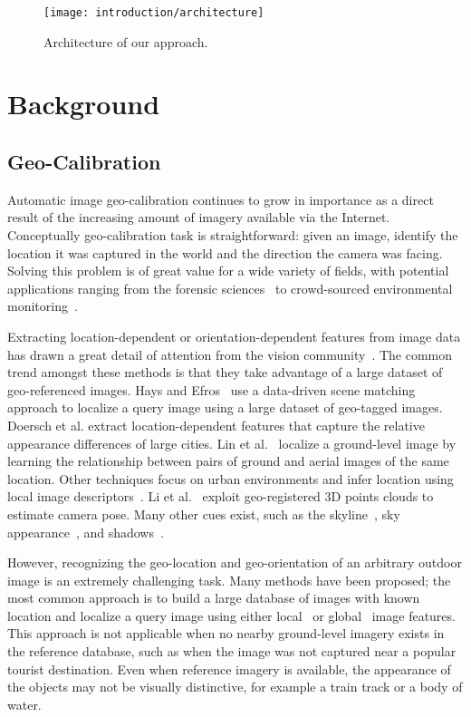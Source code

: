 \begin{figure}
  \centering
  \texttt{[image: introduction/architecture]}
  \caption{Architecture of our approach.}
  \label{fig:intro:architecture}
\end{figure}

\section{Background}

\subsection{Geo-Calibration}
Automatic image geo-calibration continues to grow in importance as a
direct result of the increasing amount of imagery available
via the Internet. Conceptually geo-calibration task is
straightforward: given an image, identify the location it was captured
in the world and the direction the camera was facing. Solving this
problem is of great value for a wide variety of fields, with potential
applications ranging from the forensic sciences~\cite{stylianou13jane}
to crowd-sourced environmental monitoring~\cite{zhang2012mining}.

Extracting location-dependent or orientation-dependent features from
image data has drawn a great detail of attention from the vision
community~\cite{jacobs07geolocate, jacobs11geolocate,
jacobs08geoorient}. The common trend amongst these methods is that
they take advantage of a large dataset of geo-referenced images. Hays
and Efros~\cite{hays2008im2gps} use a data-driven scene matching
approach to localize a query image using a large dataset of geo-tagged
images.  Doersch et al. extract location-dependent features that
capture the relative appearance differences of large cities.  Lin et
al.~\cite{lin2013cross} localize a ground-level image by learning the
relationship between pairs of ground and aerial images of the same
location. Other techniques focus on urban environments and infer
location using local image
descriptors~\cite{schindler2008detecting,snavely2006photo}. Li et
al.~\cite{li2012worldwide} exploit geo-registered 3D points clouds to
estimate camera pose. Many other cues exist, such as the
skyline~\cite{baatz2012large,ramalingam2009geolocalization}, sky
appearance~\cite{lalonde2010sun,workman2014rainbow}, and
shadows~\cite{junejo2008estimating,wu2010geo}.

However, recognizing the geo-location and geo-orientation of an
arbitrary outdoor image is an extremely challenging task.  Many
methods have been proposed; the most common approach is to build a
large database of images with known location and localize a query
image using either local~\cite{li2010location,schindler2008detecting}
or global~\cite{hays2008im2gps,doersch2012what} image features.  This
approach is not applicable when no nearby ground-level imagery exists
in the reference database, such as when the image was not captured
near a popular tourist destination.  Even when reference imagery is
available, the appearance of the objects may not be visually
distinctive, for example a train track or a body of water. 


